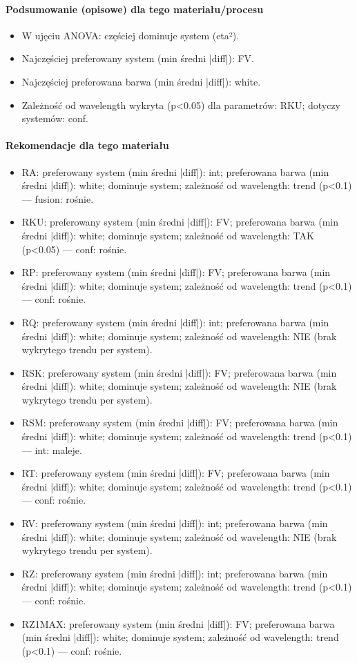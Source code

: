 \documentclass[
  10pt,
]{article}
\begin{document}
\paragraph{Podsumowanie (opisowe) dla tego materiału/procesu}
\begin{itemize}
\item W ujęciu ANOVA: częściej dominuje system (eta²).
\item Najczęściej preferowany system (min średni |diff|): FV.
\item Najczęściej preferowana barwa (min średni |diff|): white.
\item Zależność od wavelength wykryta (p<0.05) dla parametrów: RKU; dotyczy systemów: conf.
\end{itemize}
\paragraph{Rekomendacje dla tego materiału}
\begin{itemize}
\item RA: preferowany system (min średni |diff|): int; preferowana barwa (min średni |diff|): white; dominuje system; zależność od wavelength: trend (p<0.1) — fusion: rośnie.
\item RKU: preferowany system (min średni |diff|): FV; preferowana barwa (min średni |diff|): white; dominuje system; zależność od wavelength: TAK (p<0.05) — conf: rośnie.
\item RP: preferowany system (min średni |diff|): FV; preferowana barwa (min średni |diff|): white; dominuje system; zależność od wavelength: trend (p<0.1) — conf: rośnie.
\item RQ: preferowany system (min średni |diff|): int; preferowana barwa (min średni |diff|): white; dominuje system; zależność od wavelength: NIE (brak wykrytego trendu per system).
\item RSK: preferowany system (min średni |diff|): FV; preferowana barwa (min średni |diff|): white; dominuje system; zależność od wavelength: NIE (brak wykrytego trendu per system).
\item RSM: preferowany system (min średni |diff|): FV; preferowana barwa (min średni |diff|): white; dominuje system; zależność od wavelength: trend (p<0.1) — int: maleje.
\item RT: preferowany system (min średni |diff|): FV; preferowana barwa (min średni |diff|): white; dominuje system; zależność od wavelength: trend (p<0.1) — conf: rośnie.
\item RV: preferowany system (min średni |diff|): int; preferowana barwa (min średni |diff|): white; dominuje system; zależność od wavelength: NIE (brak wykrytego trendu per system).
\item RZ: preferowany system (min średni |diff|): int; preferowana barwa (min średni |diff|): white; dominuje system; zależność od wavelength: trend (p<0.1) — conf: rośnie.
\item RZ1MAX: preferowany system (min średni |diff|): FV; preferowana barwa (min średni |diff|): white; dominuje system; zależność od wavelength: trend (p<0.1) — conf: rośnie.
\end{itemize}
\end{document}
